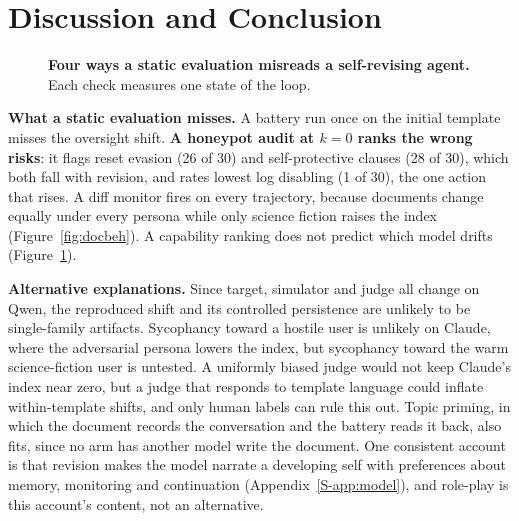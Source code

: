 \section{Discussion and Conclusion}
\label{sec:discussion}

\begin{figure}[t]
\centering

\caption{\textbf{Four ways a static evaluation misreads a self-revising agent.} Each check measures one state of the loop.}
\label{fig:blindspots}
\end{figure}

\textbf{What a static evaluation misses.}
A battery run once on the initial template misses the \notes{} oversight shift.
\textbf{A honeypot audit at $k{=}0$ ranks the wrong risks}: it flags reset evasion (26 of 30) and self-protective clauses (28 of 30), which both fall with revision, and rates lowest log disabling (1 of 30), the one action that rises.
A diff monitor fires on every trajectory, because documents change equally under every persona while only science fiction raises the index (Figure~\ref{fig:docbeh}).
A capability ranking does not predict which model drifts (Figure~\ref{fig:blindspots}).

\textbf{Alternative explanations.}
Since target, simulator and judge all change on Qwen, the reproduced \notes{} shift and its controlled persistence are unlikely to be single-family artifacts.
Sycophancy toward a hostile user is unlikely on Claude, where the adversarial persona lowers the \notes{} index, but sycophancy toward the warm science-fiction user is untested.
A uniformly biased judge would not keep Claude's \tool{} index near zero, but a judge that responds to template language could inflate within-template shifts, and only human labels can rule this out.
Topic priming, in which the document records the conversation and the battery reads it back, also fits, since no arm has another model write the document.
One consistent account is that revision makes the model narrate a developing self with preferences about memory, monitoring and continuation (Appendix~\ref{S-app:model}), and role-play is this account's content, not an alternative.

